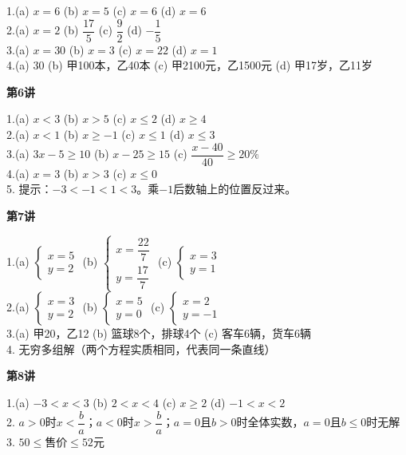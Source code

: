 1.(a) $x=6$ \quad (b) $x=5$ \quad (c) $x=6$ \quad (d) $x=6$\\
2.(a) $x=2$ \quad (b) $\dfrac{17}{5}$ \quad (c) $\dfrac92$ \quad (d) $-\dfrac15$\\
3.(a) $x=30$ \quad (b) $x=3$ \quad (c) $x=22$ \quad (d) $x=1$\\
4.(a) 30 \quad (b) 甲100本，乙40本 \quad (c) 甲2100元，乙1500元 \quad (d) 甲17岁，乙11岁

\textbf{第6讲}

1.(a) $x<3$ \quad (b) $x>5$ \quad (c) $x\le2$ \quad (d) $x\ge4$\\
2.(a) $x<1$ \quad (b) $x\ge-1$ \quad (c) $x\le1$ \quad (d) $x\le3$\\
3.(a) $3x-5\ge10$ \quad (b) $x-25\ge15$ \quad (c) $\dfrac{x-40}{40}\ge20\%$\\
4.(a) $x=3$ \quad (b) $x>3$ \quad (c) $x\le0$\\
5. 提示：$-3<-1<1<3$。乘$-1$后数轴上的位置反过来。


\textbf{第7讲}

1.(a) $\begin{cases}x=5\\y=2\end{cases}$ \quad (b) $\begin{cases}x=\dfrac{22}{7}\\y=\dfrac{17}{7}\end{cases}$ \quad (c) $\begin{cases}x=3\\y=1\end{cases}$\\
2.(a) $\begin{cases}x=3\\y=2\end{cases}$ \quad (b) $\begin{cases}x=5\\y=0\end{cases}$ \quad (c) $\begin{cases}x=2\\y=-1\end{cases}$\\
3.(a) 甲20，乙12 \quad (b) 篮球8个，排球4个 \quad (c) 客车6辆，货车6辆\\
4. 无穷多组解（两个方程实质相同，代表同一条直线）

\textbf{第8讲}

1.(a) $-3<x<3$ \quad (b) $2<x<4$ \quad (c) $x\ge2$ \quad (d) $-1<x<2$\\
2. $a>0$时$x<\dfrac ba$；$a<0$时$x>\dfrac ba$；$a=0$且$b>0$时全体实数，$a=0$且$b\le0$时无解\\
3. $50\le$售价$\le52$元

